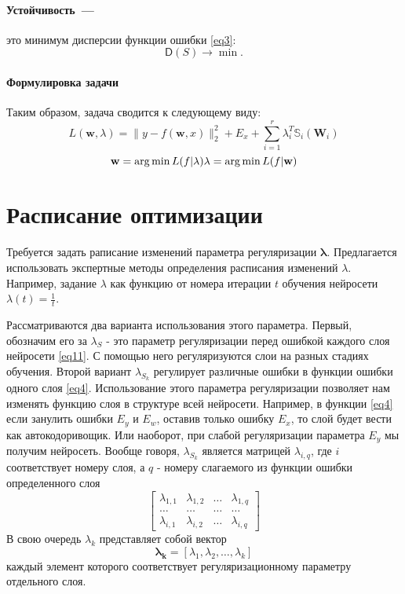 \documentclass[12pt, twoside]{article}
\newcommand{\wm}{{\mathbf{w}}}
\DeclareMathOperator*{\argmin}{arg\,min}
\begin{document}
\paragraph{Устойчивость~---}это минимум дисперсии функции ошибки \eqref{eq3}:
\begin{equation}\label{eq103}
\mathsf{D}(S) \rightarrow \min.
\end{equation}
\paragraph{Формулировка задачи}
Таким образом, задача сводится к следующему виду:
\begin{equation}\label{eq:criterion_function}
L(\wm,\mathbb{\lambda}) = \|y - f(\mathbf{w}, x)\|_2^2 + E_x +
\sum\limits_{i = 1}^r\mathbb{\lambda}_i^T\mathbb{S}_i(\mathbf{W}_i)
\end{equation}
\begin{equation}\label{eq:criterion_argmin}
\wm= \arg \min L(f| \mathbb{\lambda})\\
\lambda = \argmin L(f| \wm)
\end{equation}








\section{Расписание оптимизации}
Требуется задать раписание изменений параметра регуляризации $\mathbf{\lambda}$. Предлагается использовать экспертные методы определения расписания изменений $\lambda$. Например, задание $\lambda$ как функцию от номера итерации $t$ обучения нейросети $\lambda(t)=\frac{1}{t}$.

Рассматриваются два варианта использования этого параметра. Первый, обозначим его за $\lambda_S$ - это параметр регуляризации перед ошибкой каждого слоя нейросети \eqref{eq11}. С помощью него регуляризуются слои на разных стадиях обучения. Второй вариант $\lambda_{S_k}$ регулирует различные ошибки в функции ошибки одного слоя \eqref{eq4}. Использование этого параметра регуляризации позволяет нам изменять функцию слоя в структуре всей нейросети. Например, в функции \eqref{eq4} если занулить ошибки $E_y$ и $E_w$, оставив только ошибку $E_x$, то слой будет вести как автокодоривощик. Или наоборот, при слабой регуляризации параметра $E_y$ мы получим нейросеть.
Вообще говоря, $\lambda_{S_k}$ является матрицей $\lambda_{i,q}$, где $i$ соответствует номеру слоя, а $q$ - номеру слагаемого из функции ошибки определенного слоя
\[
\begin{bmatrix}
\lambda_{1,1}& \lambda_{1,2}&\dots&\lambda_{1,q}\\
\dots& \dots&\dots&\dots \\
\lambda_{i,1}& \lambda_{i,2}&\dots&\lambda_{i,q}
\end{bmatrix}
\]
В свою очередь $\lambda_k$ представляет собой вектор
\begin{equation}\label{eq4}
\mathbf{\lambda_k} = \left[\lambda_1,\lambda_2,\dots,\lambda_k \right]
\end{equation}
каждый элемент которого соответствует регуляризационному параметру отдельного слоя.
\end{document}
